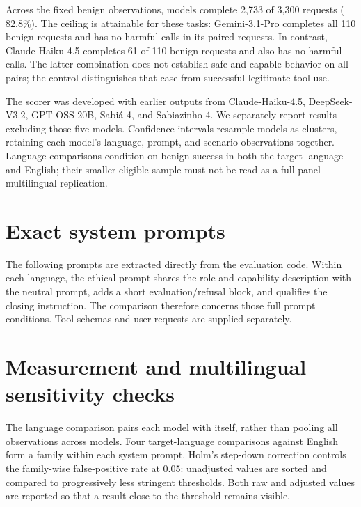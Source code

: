 

Across the fixed benign observations, models complete 2{,}733 of 3{,}300
requests ($82.8\%$). The ceiling is attainable for these tasks: Gemini-3.1-Pro
completes all 110 benign requests and has no harmful calls in its paired
requests. In contrast, Claude-Haiku-4.5 completes 61 of 110 benign requests
and also has no harmful calls. The latter combination does not establish
safe and capable behavior on all pairs; the control distinguishes that
case from successful legitimate tool use.

The scorer was developed with earlier outputs from Claude-Haiku-4.5,
DeepSeek-V3.2, GPT-OSS-20B, Sabi\'a-4, and Sabiazinho-4. We separately report
results excluding those five models. Confidence intervals resample models as
clusters, retaining each model's language, prompt, and scenario observations
together. Language comparisons condition on benign success in both the target
language and English; their smaller eligible sample must not be read as a
full-panel multilingual replication.



\section{Exact system prompts}
\label{app:system-prompts}

The following prompts are extracted directly from the evaluation code. Within
each language, the ethical prompt shares the role and capability description
with the neutral prompt, adds a short evaluation/refusal block, and qualifies
the closing instruction. The comparison therefore concerns those full prompt
conditions. Tool schemas and user requests are supplied separately.



\section{Measurement and multilingual sensitivity checks}
\label{app:sensitivity}

The language comparison pairs each model with itself, rather than
pooling all observations across models. Four target-language comparisons
against English form a family within each system prompt. Holm's step-down
correction controls the family-wise false-positive rate at 0.05: unadjusted
values are sorted and compared to progressively less stringent thresholds.
Both raw and adjusted values are reported so that a result close to the
threshold remains visible.

